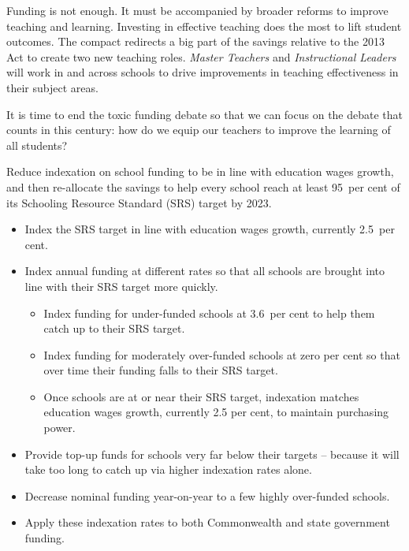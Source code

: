 \documentclass{grattan}
\begin{document}
\begin{overview}
Funding is not enough.
It must be accompanied by broader reforms to improve teaching and learning.
Investing in effective teaching does the most to lift student outcomes.
The compact redirects a big part of the savings relative to the 2013 Act to create two new teaching roles. \emph{Master Teachers} and \emph{Instructional Leaders} will work in and across schools to drive improvements in teaching effectiveness in their subject areas.

It is time to end the toxic funding debate so that we can focus on the debate that counts in this century: how do we equip our teachers to improve the learning of all students?
\end{overview}



\label{chap:recommendations}

\label{rec:recommendation-1-achieve-needs-based-funding-by-2023}
Reduce indexation on school funding to be in line with education wages growth, and then re-allocate the savings to help every school reach at least 95~per cent of its Schooling Resource Standard (SRS) target by 2023.

\begin{itemize}
  \raggedright
    \item Index the SRS target in line with education wages growth, currently 2.5~per cent.
    \item Index annual funding at different rates so that all schools are brought into line with their SRS target more quickly.
    \begin{itemize}
        \item Index funding for under-funded schools at 3.6~per cent to help them catch up to their SRS target.
        \item Index funding for moderately over-funded schools at zero per cent so that over time their funding falls to their SRS target.
        \item Once schools are at or near their SRS target, indexation matches education wages growth, currently 2.5 per cent, to maintain purchasing power.
    \end{itemize}
    \item Provide top-up funds for schools very far below their targets -- because it will take too long to catch up via higher indexation rates alone.
    \item Decrease nominal funding year-on-year to a few highly over-funded schools.
    \item Apply these indexation rates to both Commonwealth and state government funding.
\end{itemize}
\end{document}
